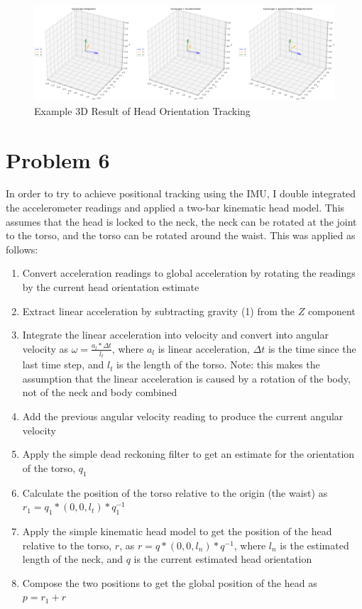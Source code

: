 \documentclass[11pt,a4paper]{article}
\begin{document}
	\begin{figure}[h!]
		\centering
		\includegraphics[width=1.0\linewidth]{figures/Orientation_Tracking_3D}
		\caption{Example 3D Result of Head Orientation Tracking}
		\label{3D_Orientation}
	\end{figure}
	
	
	\section*{Problem 6}
	
	In order to try to achieve positional tracking using the IMU, I double integrated the accelerometer readings and applied a two-bar kinematic head model. This assumes that the head is locked to the neck, the neck can be rotated at the joint to the torso, and the torso can be rotated around the waist. This was applied as follows:
	
	\begin{enumerate}[noitemsep]
		\item Convert acceleration readings to global acceleration by rotating the readings by the current head orientation estimate
		\item Extract linear acceleration by subtracting gravity (1) from the $Z$ component
		\item Integrate the linear acceleration into velocity and convert into angular velocity as $\omega=\frac{a_l*\Delta t}{l_t}$, where $a_l$ is linear acceleration, $\Delta t$ is the time since the last time step, and $l_t$ is the length of the torso.
		Note: this makes the assumption that the linear acceleration is caused by a rotation of the body, not of the neck and body combined
		\item Add the previous angular velocity reading to produce the current angular velocity
		\item Apply the simple dead reckoning filter to get an estimate for the orientation of the torso, $q_1$
		\item Calculate the position of the torso relative to the origin (the waist) as $r_1=q_1*(0,0,l_t)*q_1^{-1}$
		\item Apply the simple kinematic head model to get the position of the head relative to the torso, $r$, as $r=q*(0,0,l_n)*q^{-1}$, where $l_n$ is the estimated length of the neck, and $q$ is the current estimated head orientation
		\item Compose the two positions to get the global position of the head as $p=r_1+r$
	\end{enumerate}
\end{document}
